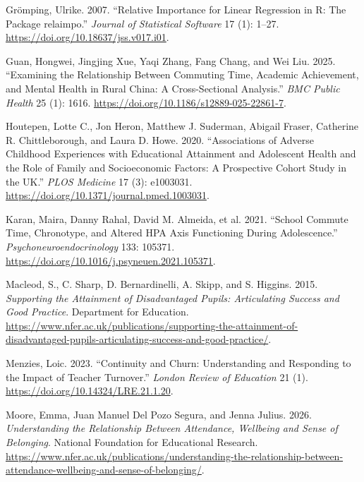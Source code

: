 \documentclass[
  12pt,
  titlepage]{article}
\newlength{\cslhangindent}
\newenvironment{CSLReferences}[2] %
 {\begin{list}{}{%
  \setlength{\itemindent}{0pt}
  \setlength{\leftmargin}{0pt}
  \setlength{\parsep}{0pt}
  \ifodd #1
   \setlength{\leftmargin}{\cslhangindent}
   \setlength{\itemindent}{-1\cslhangindent}
  \fi
  \setlength{\itemsep}{#2\baselineskip}}}
 {\end{list}}
\begin{document}
\begin{CSLReferences}{1}{1}
Grömping, Ulrike. 2007. {``Relative Importance for Linear Regression in
{R}: The Package {relaimpo}.''} \emph{Journal of Statistical Software}
17 (1): 1--27. \url{https://doi.org/10.18637/jss.v017.i01}.

Guan, Hongwei, Jingjing Xue, Yaqi Zhang, Fang Chang, and Wei Liu. 2025.
{``Examining the Relationship Between Commuting Time, Academic
Achievement, and Mental Health in Rural {China}: A Cross-Sectional
Analysis.''} \emph{BMC Public Health} 25 (1): 1616.
\url{https://doi.org/10.1186/s12889-025-22861-7}.

Houtepen, Lotte C., Jon Heron, Matthew J. Suderman, Abigail Fraser,
Catherine R. Chittleborough, and Laura D. Howe. 2020. {``Associations of
Adverse Childhood Experiences with Educational Attainment and Adolescent
Health and the Role of Family and Socioeconomic Factors: {A} Prospective
Cohort Study in the {UK}.''} \emph{PLOS Medicine} 17 (3): e1003031.
\url{https://doi.org/10.1371/journal.pmed.1003031}.

Karan, Maira, Danny Rahal, David M. Almeida, et al. 2021. {``School
Commute Time, Chronotype, and Altered {HPA} Axis Functioning During
Adolescence.''} \emph{Psychoneuroendocrinology} 133: 105371.
\url{https://doi.org/10.1016/j.psyneuen.2021.105371}.

Macleod, S., C. Sharp, D. Bernardinelli, A. Skipp, and S. Higgins. 2015.
\emph{Supporting the {Attainment} of {Disadvantaged} {Pupils}:
{Articulating} {Success} and {Good} {Practice}}. Department for
Education.
\url{https://www.nfer.ac.uk/publications/supporting-the-attainment-of-disadvantaged-pupils-articulating-success-and-good-practice/}.

Menzies, Loic. 2023. {``Continuity and Churn: Understanding and
Responding to the Impact of Teacher Turnover.''} \emph{London Review of
Education} 21 (1). \url{https://doi.org/10.14324/LRE.21.1.20}.

Moore, Emma, Juan Manuel Del Pozo Segura, and Jenna Julius. 2026.
\emph{Understanding the Relationship Between Attendance, Wellbeing and
Sense of Belonging}. National Foundation for Educational Research.
\url{https://www.nfer.ac.uk/publications/understanding-the-relationship-between-attendance-wellbeing-and-sense-of-belonging/}.


\end{CSLReferences}
\end{document}

